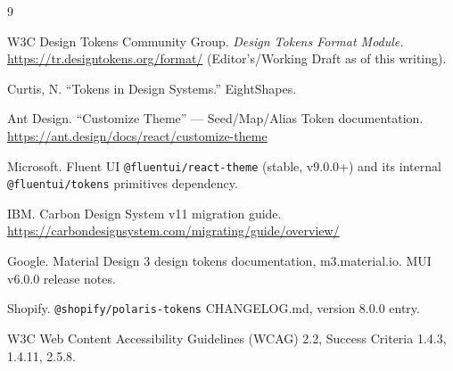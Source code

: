 \documentclass[11pt]{article}
\begin{document}
\begin{thebibliography}{9}

W3C Design Tokens Community Group. \emph{Design Tokens Format Module.} \url{https://tr.designtokens.org/format/} (Editor's/Working Draft as of this writing).

Curtis, N. ``Tokens in Design Systems.'' EightShapes.

Ant Design. ``Customize Theme'' --- Seed/Map/Alias Token documentation. \url{https://ant.design/docs/react/customize-theme}

Microsoft. Fluent UI \texttt{@fluentui/react-theme} (stable, v9.0.0+) and its internal \texttt{@fluentui/tokens} primitives dependency.

IBM. Carbon Design System v11 migration guide. \url{https://carbondesignsystem.com/migrating/guide/overview/}

Google. Material Design 3 design tokens documentation, m3.material.io. MUI v6.0.0 release notes.

Shopify. \texttt{@shopify/polaris-tokens} CHANGELOG.md, version 8.0.0 entry.

W3C Web Content Accessibility Guidelines (WCAG) 2.2, Success Criteria 1.4.3, 1.4.11, 2.5.8.

\end{thebibliography}
\end{document}
